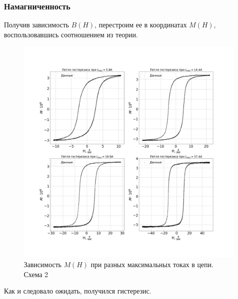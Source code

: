 \documentclass[a4paper,14pt]{extarticle}
\begin{document}
			\subsubsection{Намагниченность}
				Получив зависимость $B(H)$, перестроим ее в координатах $M(H)$, воспользовавшись соотношением из теории.
				\begin{figure}[h]
					\centering
					\includegraphics[width=1.0\linewidth]{Lab2_4.png}
					\caption{Зависимость $M(H)$ при разных максимальных токах в цепи. Схема 2}
					\label{fig7}
				\end{figure}
				Как и следовало ожидать, получился гистерезис.
\end{document}
